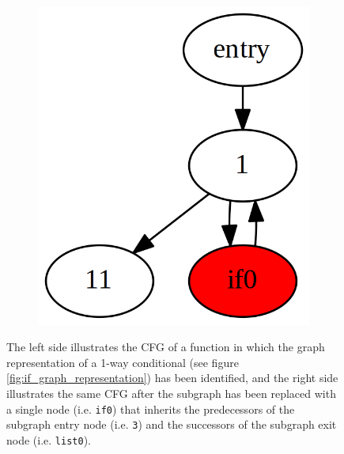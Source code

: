 \begin{figure}[htbp]
\begin{subfigure}[ht]{0.15\textwidth}
		\includegraphics[width=\textwidth]{inc/2_lit_review/cfg_post_merge.png}
	\end{subfigure}
	\caption{The left side illustrates the CFG of a function in which the graph representation of a 1-way conditional (see figure \ref{fig:if_graph_representation}) has been identified, and the right side illustrates the same CFG after the subgraph has been replaced with a single node (i.e. \texttt{if0}) that inherits the predecessors of the subgraph entry node (i.e. \texttt{3}) and the successors of the subgraph exit node (i.e. \texttt{list0}).}
	\label{fig:subgraph_merge}
\end{figure}
